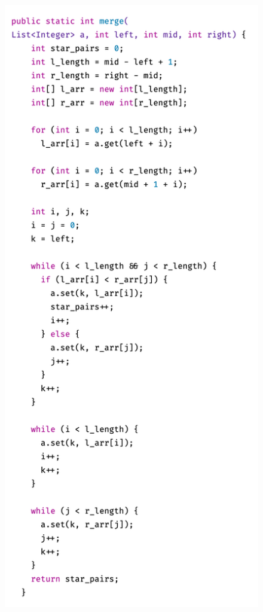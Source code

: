 \documentclass[11pt]{article}
\begin{document}
\begin{figure}
\centering
\begin{minipage}{.5\textwidth}
  \centering
  \includegraphics[width=\linewidth]{merge.png}

\end{minipage}
\end{figure}
\end{document}
